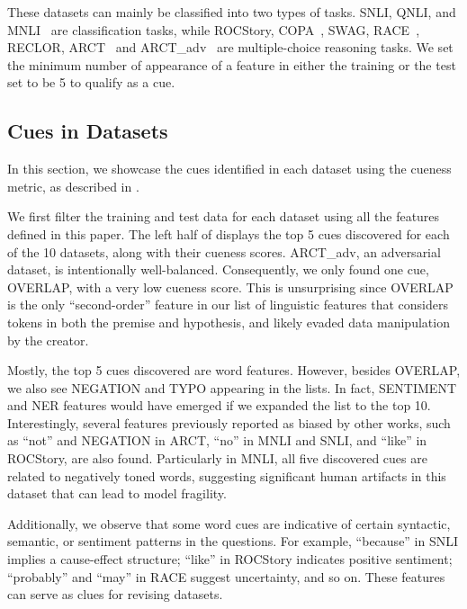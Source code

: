 These datasets can mainly be classified into two types of tasks. 
SNLI, QNLI, and MNLI~\cite{WilliamsNB18} are classification tasks, while 
ROCStory, COPA~\cite{roemmele2011choice}, SWAG, 
RACE~\cite{lai2017race}, 
RECLOR, %
ARCT~\cite{habernal2017argument} and ARCT\_adv~\cite{schuster2019towards} are
multiple-choice reasoning tasks. 
We set the minimum number of appearance of a feature
in either the training or the test set to be 5 to qualify as a cue.


\subsection{Cues in Datasets} 

In this section, we showcase the cues identified in each dataset using 
the cueness metric, as described in . 

We first filter the training and test data for each dataset using all the features defined in this paper. The left half of  displays the top 5 cues discovered for each of the 10 datasets, along with their cueness scores. ARCT\_adv, an adversarial dataset, is intentionally well-balanced. Consequently, we only found one cue, OVERLAP, with a very low cueness score. This is unsurprising since OVERLAP is the only ``second-order'' feature in our list of linguistic features that considers tokens in both the premise and hypothesis, and likely evaded data manipulation by the creator.

Mostly, the top 5 cues discovered are word features. However, besides OVERLAP, we also see NEGATION and TYPO appearing in the lists. In fact, SENTIMENT and NER features would have emerged if we expanded the list to the top 10. Interestingly, several features previously reported as biased by other works, such as ``not'' and NEGATION in ARCT, ``no'' in MNLI and SNLI, and ``like'' in ROCStory, are also found. Particularly in MNLI, all five discovered cues are related to negatively toned words, suggesting significant human artifacts in this dataset that can lead to model fragility.

Additionally, we observe that some word cues are indicative of certain syntactic, semantic, or sentiment patterns in the questions. For example, ``because'' in SNLI implies a cause-effect structure; ``like'' in ROCStory indicates positive sentiment; ``probably'' and ``may'' in RACE suggest uncertainty, and so on. These features can serve as clues for revising datasets.




